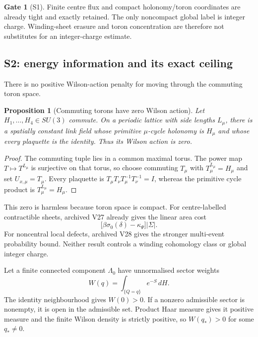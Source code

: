 \documentclass[11pt]{article}
\newtheorem{proposition}[theorem]{Proposition}
\theoremstyle{definition}
\newtheorem{gate}[theorem]{Gate}
\theoremstyle{remark}
\begin{document}
\begin{gate}[S1]
Finite centre flux and compact holonomy/toron coordinates are already tight
and exactly retained.  The only noncompact global label is integer charge.
Winding-sheet erasure and toron concentration are therefore not substitutes
for an integer-charge estimate.
\end{gate}

\subsection{S2: energy information and its exact ceiling}

There is no positive Wilson-action penalty for moving through the commuting
toron space.

\begin{proposition}[Commuting torons have zero Wilson action]
\label{prop:toron-zero-action}
Let $H_1,\ldots,H_4\in SU(3)$ commute.  On a periodic lattice with side
lengths $L_\mu$, there is a spatially constant link field whose primitive
$\mu$-cycle holonomy is $H_\mu$ and whose every plaquette is the identity.
Thus its Wilson action is zero.
\end{proposition}

\begin{proof}
The commuting tuple lies in a common maximal torus.  The power map
$T\mapsto T^{L_\mu}$ is surjective on that torus, so choose commuting
$T_\mu$ with $T_\mu^{L_\mu}=H_\mu$ and set $U_{x,\mu}=T_\mu$.
Every plaquette is
$T_\mu T_\nu T_\mu^{-1}T_\nu^{-1}=I$, whereas the primitive cycle product is
$T_\mu^{L_\mu}=H_\mu$.
\end{proof}

This zero is harmless because toron space is compact.  For centre-labelled
contractible sheets, archived V27 already gives the linear area cost
\[
 \bigl[\beta\sigma_0(\delta)-\kappa_\Psi\bigr]|\Sigma|.
\]
For noncentral local defects, archived V28 gives the stronger multi-event
probability bound.  Neither result controls a winding cohomology class or
global integer charge.

Let a finite connected component $\Lambda_0$ have unnormalised sector weights
\[
 W(q)=\int_{\{Q=q\}}e^{-S}\,dH.                              \tag{6.5}
\]
The identity neighbourhood gives $W(0)>0$.  If a nonzero admissible sector is
nonempty, it is open in the admissible set.  Product Haar measure gives it
positive measure and the finite Wilson density is strictly positive, so
$W(q_*)>0$ for some $q_*\ne0$.
\end{document}
